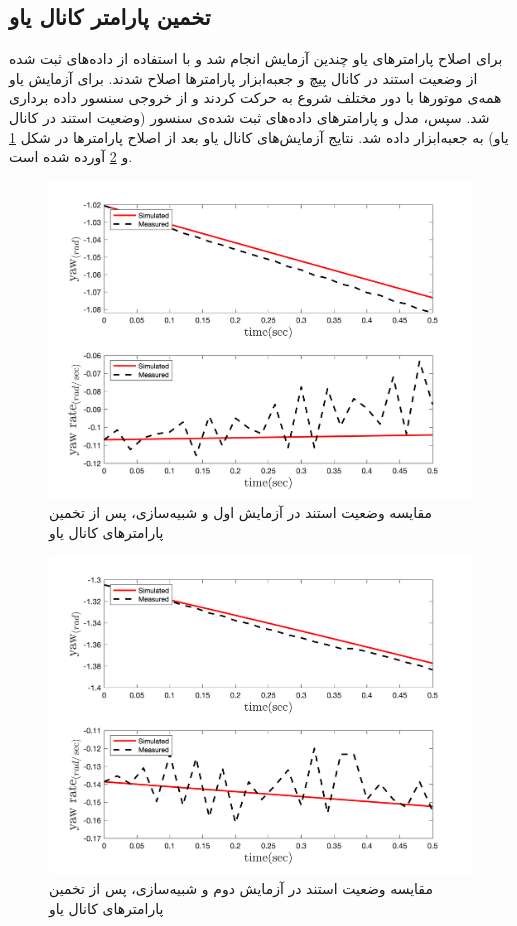\subsection{تخمین پارامتر کانال یاو}
برای اصلاح پارامترهای یاو چندین آزمایش انجام شد و با استفاده از داده‌های ثبت شده از وضعیت استند در کانال پیچ  و جعبه‌ابزار
پارامترها اصلاح شدند.
برای آزمایش یاو همه‌ی موتورها با دور مختلف شروع به حرکت کردند و از خروجی‌ سنسور داده برداری شد. سپس، مدل و پارامترهای داده‌های ثبت شده‌ی سنسور (وضعیت استند در کانال یاو) به جعبه‌ابزار
داده شد. نتایج آزمایش‌های کانال یاو بعد از اصلاح پارامترها در شکل
\ref{yaw_ps1} و \ref{yaw_ps2}
آورده شده است.

\begin{figure}[H]
	\includegraphics[width=12cm]{../../Figures/RCP/yaw_parameter_estimation/RCP_yaw_S1.png}
	\centering
	\caption{مقايسه وضعیت استند در  آزمايش اول و شبیه‌سازی، پس از تخمین پارامترهای کانال یاو}
	\label{yaw_ps1}
\end{figure}

\begin{figure}[H]
	\includegraphics[width=12cm]{../../Figures/RCP/yaw_parameter_estimation/RCP_yaw_S2.png}
	\centering
	\caption{مقايسه وضعیت استند در  آزمايش دوم و شبیه‌سازی، پس از تخمین پارامترهای کانال یاو}
	\label{yaw_ps2}
\end{figure}
